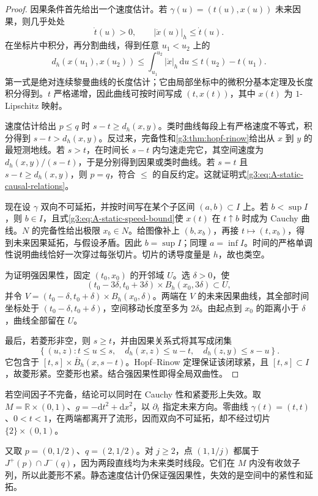 \begin{proof}
	因果条件首先给出一个速度估计。若 \(\gamma(u)=(t(u),x(u))\) 未来因果，则几乎处处
	\[
		\dot t(u)>0,
		\qquad |\dot x(u)|_h\le\dot t(u).
	\]
	在坐标片中积分，再分割曲线，得到任意 \(u_1<u_2\) 上的
	\begin{equation}\label{g3:eq:A-static-speed-bound}
		d_h(x(u_1),x(u_2))
		\le\int_{u_1}^{u_2}|\dot x|_h\,\mathrm du
		\le t(u_2)-t(u_1).
	\end{equation}
	第一式是绝对连续黎曼曲线的长度估计；它由局部坐标中的微积分基本定理及长度积分得到。\(t\) 严格递增，因此曲线可按时间写成 \((t,x(t))\)，其中 \(x(t)\) 为 \(1\)-Lipschitz 映射。

	速度估计给出 \(p\le q\) 时 \(s-t\ge d_h(x,y)\)。类时曲线每段上有严格速度不等式，积分得到 \(s-t>d_h(x,y)\)。反过来，完备性和\cref{g3:thm:hopf-rinow}给出从 \(x\) 到 \(y\) 的最短测地线。若 \(s>t\)，在时间长 \(s-t\) 内匀速走完它，其空间速度为 \(d_h(x,y)/(s-t)\)，于是分别得到因果或类时曲线。若 \(s=t\) 且 \(s-t\ge d_h(x,y)\)，则 \(p=q\)，符合 \(\le\) 的自反约定。这就证明式\eqref{g3:eq:A-static-causal-relations}。

	现在设 \(\gamma\) 双向不可延拓，并按时间写在某个子区间 \((a,b)\subset I\) 上。若 \(b<\sup I\)，则 \(b\in I\)，且式\eqref{g3:eq:A-static-speed-bound}使 \(x(t)\) 在 \(t\uparrow b\) 时成为 Cauchy 曲线。\(N\) 的完备性给出极限 \(x_b\in N\)。给图像补上 \((b,x_b)\)，再接 \(t\mapsto(t,x_b)\)，得到未来因果延拓，与假设矛盾。因此 \(b=\sup I\)；同理 \(a=\inf I\)。时间的严格单调性说明曲线恰好一次穿过每张切片。切片的诱导度量是 \(h\)，故也类空。

	为证明强因果性，固定 \((t_0,x_0)\) 的开邻域 \(U\)。选 \(\delta>0\)，使
	\[
		(t_0-3\delta,t_0+3\delta)\times B_h(x_0,3\delta)
		\subset U,
	\]
	并令 \(V=(t_0-\delta,t_0+\delta)\times B_h(x_0,\delta)\)。两端在 \(V\) 的未来因果曲线，其全部时间坐标处于 \((t_0-\delta,t_0+\delta)\)，空间移动长度至多为 \(2\delta\)。由起点到 \(x_0\) 的距离小于 \(\delta\)，曲线全部留在 \(U\)。

	最后，若菱形非空，则 \(s\ge t\)，并由因果关系式将其写成闭集
	\begin{equation}\label{g3:eq:A-static-diamond}
		\left\{(u,z):t\le u\le s,\quad
		d_h(x,z)\le u-t,\quad d_h(z,y)\le s-u\right\}.
	\end{equation}
	它包含于 \([t,s]\times\overline B_h(x,s-t)\)。Hopf--Rinow 定理保证该闭球紧，且 \([t,s]\subset I\)，故菱形紧。空菱形也紧。结合强因果性即得全局双曲性。
\end{proof}

\begin{example}\label{g3:exm:A-incomplete-spatial-factor}
	若空间因子不完备，结论可以同时在 Cauchy 性和紧菱形上失效。取
	\(M=\mathbb R\times(0,1)\)、\(g=-\mathrm dt^2+\mathrm dx^2\)，以 \(\partial_t\) 指定未来方向。零曲线 \(\gamma(t)=(t,t)\)、\(0<t<1\)，在两端都离开了流形，因而双向不可延拓，却不经过切片 \(\{2\}\times(0,1)\)。

	又取 \(p=(0,1/2)\)、\(q=(2,1/2)\)。对 \(j\ge2\)，点 \((1,1/j)\) 都属于 \(J^+(p)\cap J^-(q)\)，因为两段直线均为未来类时线段。它们在 \(M\) 内没有收敛子列，所以此菱形不紧。静态速度估计仍保证强因果性，失效的是空间中的紧性和延拓。
\end{example}

